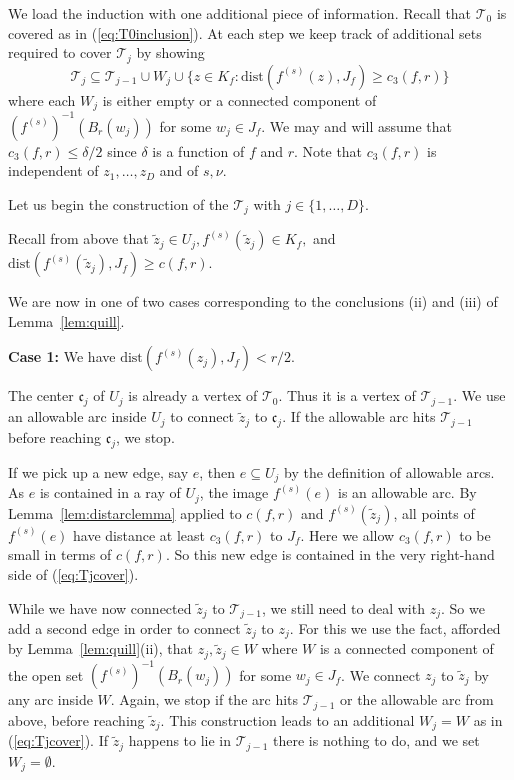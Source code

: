 \documentclass[12pt,oneside,a4]{amsart}
\newcommand{\cT}{\mathcal{T}}
\numberwithin{maincounter}{section}
\numberwithin{equation}{section}
\renewcommand{\subset}{\subseteq}
\begin{document}
We load the induction with one additional piece of information.
Recall that $\cT_0$ is covered as in (\ref{eq:T0inclusion}). 
At each step we keep track of additional sets required to cover $\cT_j$ by showing
\begin{equation}
  \label{eq:Tjcover}
  \cT_j \subset \cT_{j-1} \cup W_j\cup \{ z\in K_f :
  \mathrm{dist}(f^{(s)}(z),J_f)\ge c_3(f,r)\}
\end{equation}
where each $W_j$ is either empty or a connected component of
$(f^{(s)})^{-1}(B_{r}(w_j))$ for some $w_j\in J_f$.
We may and will assume that {$c_3(f,r)\le \delta/2$} since
$\delta$ is a function of $f$ and $r$.
Note that $c_3(f,r)$ is independent of $z_1,\ldots,z_D$ and of $s,\nu$.

Let us begin the construction of the $\cT_j$ with $j\in
\{1,\ldots,D\}$.

Recall from above that $\tilde z_j \in U_j, f^{(s)}(\tilde z_j)\in K_f,$ and
$\mathrm{dist}(f^{(s)}(\tilde z_j),J_f)\ge c(f,r)$.

We are now in one of two cases corresponding to the conclusions (ii)
and (iii) of Lemma~\ref{lem:quill}.

\textbf{Case 1:} We have $\mathrm{dist}(f^{(s)}(z_j),J_f)<r/2$.

The center $\mathfrak{c}_j$ of $U_j$ is already a vertex of $\cT_0$.
Thus it is a vertex of $\cT_{j-1}$. We use an allowable
arc inside $U_j$ to connect $\tilde z_j$ to $\mathfrak{c}_j$. If the
allowable arc hits $\cT_{j-1}$ before reaching $\mathfrak{c}_j$, we
stop.

If we pick up a new edge, say $e$, then $e\subset U_j$ by the
definition of allowable arcs.
As $e$ is contained in a ray of $U_j$, the image $f^{(s)}(e)$ is an
allowable arc. 
 By
Lemma~\ref{lem:distarclemma} applied to $c(f,r)$ and $f^{(s)}(\tilde z_j)$,
all points of
$f^{(s)}(e)$ have distance at least $c_3(f,r)$ to $J_f$. Here we allow
{$c_3(f,r)$}
to be small in terms of $c(f,r)$. So this new edge is contained
in the very right-hand side of (\ref{eq:Tjcover}).

While we have now connected $\tilde z_j$ to $\cT_{j-1}$, we still need
to deal with $z_j$. So we add a second edge in order to connect $\tilde
z_j$ to $z_j$. For this we use the fact, afforded by
Lemma~\ref{lem:quill}(ii), that $z_j,\tilde z_j\in W$ where $W$ is a
connected component of the open set
$(f^{(s)})^{-1}(B_{r}(w_j))$ for some $w_j\in J_f$.
We connect $z_j$ to $\tilde z_j$ by any arc
inside $W$. Again, we stop if the arc hits $\cT_{j-1}$ or the
allowable arc from above, before reaching $\tilde z_j$. This
construction leads to an additional $W_j=W$ as in (\ref{eq:Tjcover}).
If $\tilde z_j$ happens to lie in $\cT_{j-1}$ there is nothing to do, and
we set $W_j=\emptyset$. 
\end{document}
